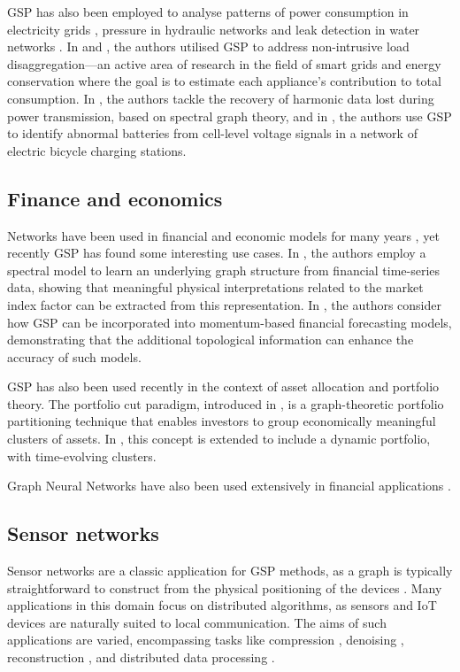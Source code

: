 GSP has also been employed to analyse patterns of power consumption in electricity grids \citep{Ramakrishna2021}, pressure in hydraulic networks \citep{Zhou2022} and leak detection in water networks \citep{Orn2022}. In \cite{He2018} and \cite{Zheng2022}, the authors utilised GSP to address non-intrusive load disaggregation—an active area of research in the field of smart grids and energy conservation where the goal is to estimate each appliance's contribution to total consumption. In \cite{Ying2022}, the authors tackle the recovery of harmonic data lost during power transmission, based on spectral graph theory, and in \cite{Wang2022b}, the authors use GSP to identify abnormal batteries from cell-level voltage signals in a network of electric bicycle charging stations.


\subsection{Finance and economics}

Networks have been used in financial and economic models for many years \citep{Marti2021}, yet recently GSP has found some interesting use cases. In \cite{Vinicius2020}, the authors employ a spectral model to learn an underlying graph structure from financial time-series data, showing that meaningful physical interpretations related to the market index factor can be extracted from this representation. In \cite{Zhang2023}, the authors consider how GSP can be incorporated into momentum-based financial forecasting models, demonstrating that the additional topological information can enhance the accuracy of such models.

GSP has also been used recently in the context of asset allocation and portfolio theory. The portfolio cut paradigm, introduced in \cite{Dees2020}, is a graph-theoretic portfolio partitioning technique that enables investors to group economically meaningful clusters of assets. In \cite{Arroyo2022}, this concept is extended to include a dynamic portfolio, with time-evolving clusters.

Graph Neural Networks have also been used extensively in financial applications \citep{Wang2022c}. 


\subsection{Sensor networks}

Sensor networks are a classic application for GSP methods, as a graph is typically straightforward to construct from the physical positioning of the devices \citep{Jablonski2017}. Many applications in this domain focus on distributed algorithms, as sensors and IoT devices are naturally suited to local communication. The aims of such applications are varied, encompassing tasks like compression \citep{Zhu2012}, denoising \citep{Tay2021}, reconstruction \citep{Wang2015}, and distributed data processing \citep{Chi2022}.

